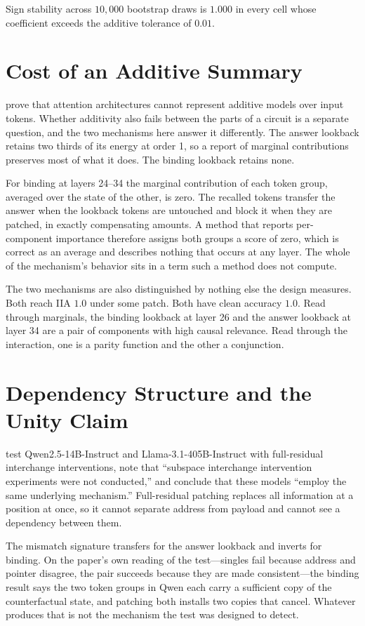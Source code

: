 \documentclass{article}
\begin{document}
Sign stability across $10{,}000$ bootstrap draws is $1.000$ in every cell whose coefficient exceeds the additive tolerance of $0.01$.


\section{Cost of an Additive Summary}

\citet{leemann2024slalom} prove that attention architectures cannot represent additive models over input tokens. Whether additivity also fails between the parts of a circuit is a separate question, and the two mechanisms here answer it differently. The answer lookback retains two thirds of its energy at order 1, so a report of marginal contributions preserves most of what it does. The binding lookback retains none.

For binding at layers 24--34 the marginal contribution of each token group, averaged over the state of the other, is zero. The recalled tokens transfer the answer when the lookback tokens are untouched and block it when they are patched, in exactly compensating amounts. A method that reports per-component importance therefore assigns both groups a score of zero, which is correct as an average and describes nothing that occurs at any layer. The whole of the mechanism's behavior sits in a term such a method does not compute.

The two mechanisms are also distinguished by nothing else the design measures. Both reach IIA $1.0$ under some patch. Both have clean accuracy $1.0$. Read through marginals, the binding lookback at layer 26 and the answer lookback at layer 34 are a pair of components with high causal relevance. Read through the interaction, one is a parity function and the other a conjunction.


\section{Dependency Structure and the Unity Claim}

\citet{prakash2025lookback} test Qwen2.5-14B-Instruct and Llama-3.1-405B-Instruct with full-residual interchange interventions, note that ``subspace interchange intervention experiments were not conducted,'' and conclude that these models ``employ the same underlying mechanism.'' Full-residual patching replaces all information at a position at once, so it cannot separate address from payload and cannot see a dependency between them.

The mismatch signature transfers for the answer lookback and inverts for binding. On the paper's own reading of the test---singles fail because address and pointer disagree, the pair succeeds because they are made consistent---the binding result says the two token groups in Qwen each carry a sufficient copy of the counterfactual state, and patching both installs two copies that cancel. Whatever produces that is not the mechanism the test was designed to detect.
\end{document}
